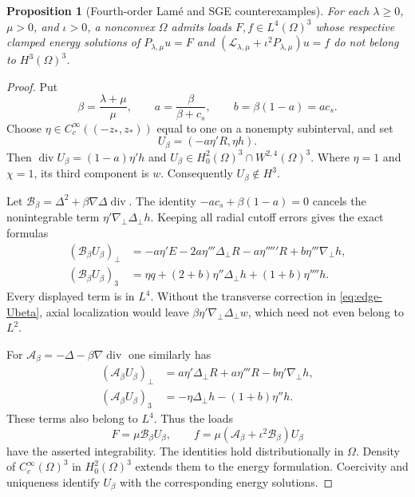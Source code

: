 \documentclass[11pt,a4paper]{article}
\newtheorem{proposition}[theorem]{Proposition}
\theoremstyle{remark}
\numberwithin{equation}{section}
\begin{document}
\begin{proposition}[Fourth-order Lam\'e and SGE counterexamples]
\label{prop:edge-lame}
For each $\lambda\ge0$, $\mu>0$, and $\iota>0$, a nonconvex $\Omega$
admits loads $F,f\in L^4(\Omega)^3$ whose respective clamped energy solutions
of $P_{\lambda,\mu}u=F$ and $(\mathcal L_{\lambda,\mu}+\iota^2P_{\lambda,\mu})u=f$
do not belong to $H^3(\Omega)^3$.
\end{proposition}
\begin{proof}
Put
\[
 \beta=\frac{\lambda+\mu}{\mu},\qquad
 a=\frac{\beta}{\beta+c_s},\qquad
 b=\beta(1-a)=ac_s .
\]
Choose $\eta\in C_c^\infty((-z_*,z_*))$ equal to one on a nonempty
subinterval, and set
\begin{equation}\label{eq:edge-Ubeta}
 U_\beta=(-a\eta'R,\eta h).
\end{equation}
Then
$\operatorname{div}U_\beta=(1-a)\eta'h$ and
$U_\beta\in H^2_0(\Omega)^3\cap W^{2,4}(\Omega)^3$.
Where $\eta=1$ and $\chi=1$, its third component is $w$.
Consequently $U_\beta\notin H^3$.

Let $\mathcal B_\beta=\Delta^2+\beta\nabla\Delta\operatorname{div}$.
The identity $-ac_s+\beta(1-a)=0$ cancels the nonintegrable
term $\eta'\nabla_\perp\Delta_\perp h$.  Keeping all radial cutoff
errors gives the exact formulas
\begin{equation}\label{eq:edge-force4}
\begin{aligned}
 (\mathcal B_\beta U_\beta)_\perp
 &=-a\eta'E-2a\eta'''\Delta_\perp R-a\eta'''''R
       +b\eta'''\nabla_\perp h,\\
 (\mathcal B_\beta U_\beta)_3
 &=\eta q+(2+b)\eta''\Delta_\perp h+(1+b)\eta''''h .
\end{aligned}
\end{equation}
Every displayed term is in $L^4$.
Without the transverse correction in \eqref{eq:edge-Ubeta}, axial
localization would leave $\beta\eta'\nabla_\perp\Delta_\perp w$,
which need not even belong to $L^2$.

For $\mathcal A_\beta=-\Delta-\beta\nabla\operatorname{div}$ one similarly has
\begin{equation}\label{eq:edge-force2}
\begin{aligned}
 (\mathcal A_\beta U_\beta)_\perp
 &=a\eta'\Delta_\perp R+a\eta'''R-b\eta'\nabla_\perp h,\\
 (\mathcal A_\beta U_\beta)_3
 &=-\eta\Delta_\perp h-(1+b)\eta''h .
\end{aligned}
\end{equation}
These terms also belong to $L^4$.
Thus the loads
\[
 F=\mu\mathcal B_\beta U_\beta,\qquad
 f=\mu(\mathcal A_\beta+\iota^2\mathcal B_\beta)U_\beta
\]
have the asserted integrability.  The identities hold distributionally in
$\Omega$.  Density of $C_c^\infty(\Omega)^3$ in $H^2_0(\Omega)^3$
extends them to the energy formulation.  Coercivity and uniqueness identify
$U_\beta$ with the corresponding energy solutions.
\end{proof}
\end{document}
